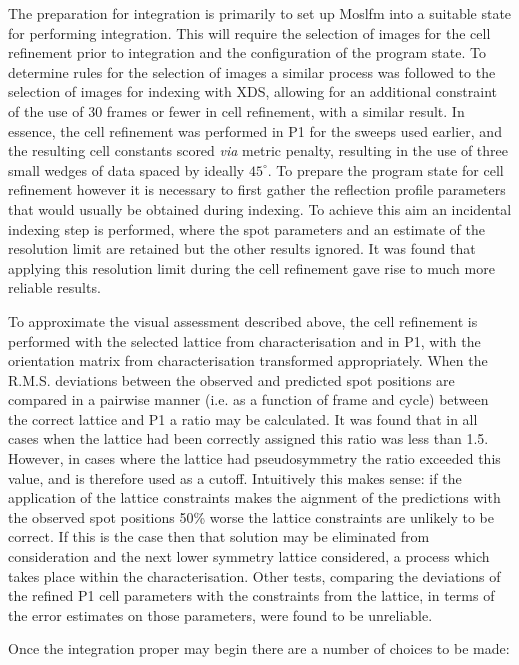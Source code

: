 \documentclass[a4paper,11pt]{article}
\begin{document}
The preparation for integration is primarily to set up Moslfm into
a suitable state for performing integration. This will require the
selection of images for the cell refinement prior to integration and
the configuration of the program state. To determine rules for the
selection of images a similar process was followed to the selection of
images for indexing with XDS, allowing for an additional constraint of
the use of 30 frames or fewer in cell refinement, with a similar
result. In essence, the cell refinement was performed in P1 for the
sweeps used earlier, and the resulting cell constants scored
\emph{via} metric penalty, resulting in the use of three small wedges
of data spaced by ideally $45^{\circ}$. To prepare the program state
for cell refinement however it is necessary to first gather the
reflection profile parameters that would usually be obtained during
indexing. To achieve this aim an incidental indexing step is
performed, where the spot parameters and an estimate of the resolution
limit are retained but the other results ignored. It was found that
applying this resolution limit during the cell refinement gave rise to
much more reliable results.

To approximate the visual assessment described above, the cell
refinement is performed with the selected lattice from
characterisation and in P1, with the orientation matrix from
characterisation transformed appropriately. When the R.M.S. deviations
between the observed and predicted spot positions are compared in a
pairwise manner (i.e. as a function of frame and cycle) between the
correct lattice and P1 a ratio may be calculated. It was found that in
all cases when the lattice had been correctly assigned this ratio was
less than 1.5. However, in cases where the lattice had pseudosymmetry
the ratio exceeded this value, and is therefore used as a
cutoff. Intuitively this makes sense: if the application of the
lattice constraints makes the aignment of the predictions with the
observed spot positions 50\% worse the lattice constraints are
unlikely to be correct. If this is the case then that solution may be
eliminated from consideration and the next lower symmetry lattice
considered, a process which takes place within the characterisation.
Other tests, comparing the deviations of the refined P1 cell
parameters with the constraints from the lattice, in terms of the
error estimates on those parameters, were found to be unreliable.

Once the integration proper may begin there are a number of choices to
be made:
\end{document}
